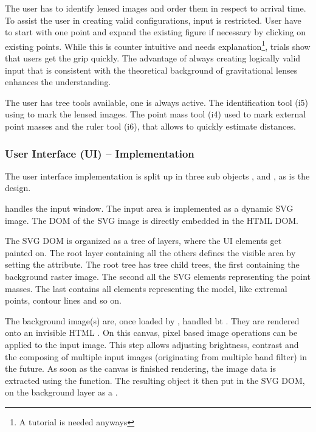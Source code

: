 The user has to identify lensed images and order them in respect to arrival time.
To assist the user in creating valid configurations, input is restricted.
User have to start with one point and expand the existing figure if necessary by clicking on existing points.
While this is counter intuitive and needs explanation\footnote{A tutorial is needed anyways}, trials show that users get the grip quickly.
The advantage of always creating logically valid input that is consistent with the theoretical background of gravitational lenses enhances the understanding.

The user has tree tools available, one is always active.
The identification tool (i5) using to mark the lensed images.
The point mass tool (i4) used to mark external point masses and the ruler tool (i6), that allows to quickly estimate distances.



\subsubsection{User Interface (UI) -- Implementation}
\label{sec:ui-impl}

The user interface implementation  is split up in three sub objects ,  and , as is the design.

 handles the input window.
The input area is implemented as a dynamic SVG image.
The DOM of the SVG image is directly embedded in the HTML DOM.

The SVG DOM is organized as a tree of layers, where the UI elements get painted on.
The root layer containing all the others defines the visible area by setting the  attribute.
The root tree has tree child trees, the first containing the background raster image.
The second all the SVG elements representing the point masses.
The last contains all elements representing the model, like extremal points, contour lines and so on.

The background image(s) are, once loaded by , handled bt .
They are rendered onto an invisible HTML .
On this canvas, pixel based image operations can be applied to the input image.
This step allows adjusting brightness, contrast and the composing of multiple input images (originating from multiple band filter) in the future.
As soon as the canvas is finished rendering, the image data is extracted using the  function. The resulting object it then put in the SVG DOM, on the background layer as a .


